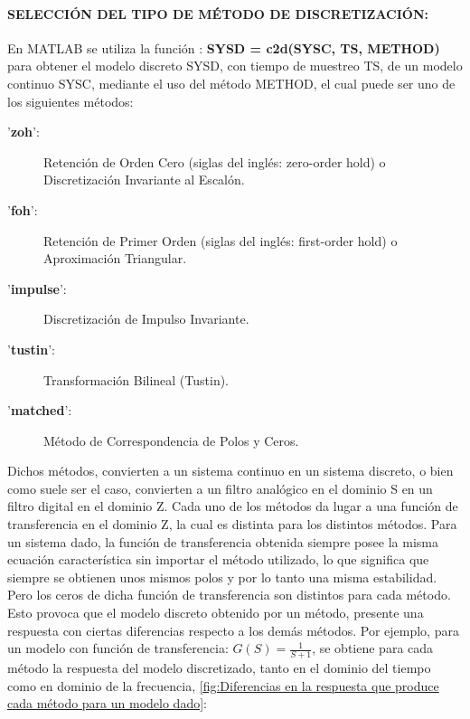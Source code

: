 \documentclass{article}
\begin{document}
\begin{sloppypar}
\paragraph{SELECCIÓN DEL TIPO DE MÉTODO DE DISCRETIZACIÓN:}
\label{sec:SELECCIÓN DEL TIPO DE MÉTODO DE DISCRETIZACIÓN:}
\hfill

\hfill

En MATLAB se utiliza la función \cite{c2d}: \textbf{SYSD = c2d(SYSC, TS, METHOD)} para obtener el modelo discreto SYSD, con tiempo de muestreo TS, de un modelo continuo SYSC, mediante el uso del método METHOD, el cual puede ser uno de los siguientes métodos:
\begin{description}
    \item ['\textbf{zoh}':] Retención de Orden Cero (siglas del inglés: zero-order hold) o Discretización Invariante al Escalón.
    \item ['\textbf{foh}':] Retención de Primer Orden (siglas del inglés: first-order hold) o Aproximación Triangular.
    \item ['\textbf{impulse}':] Discretización de Impulso Invariante.
    \item ['\textbf{tustin}':] Transformación Bilineal (Tustin).
    \item ['\textbf{matched}':] Método de Correspondencia de Polos y Ceros.
\end{description}

Dichos métodos, convierten a un sistema continuo en un sistema discreto, o bien como suele ser el caso, convierten a un filtro analógico en el dominio S en un filtro digital en el dominio Z.
Cada uno de los métodos da lugar a una función de transferencia en el dominio Z, la cual es distinta para los distintos métodos. Para un sistema dado, la función de transferencia obtenida siempre posee la misma ecuación característica sin importar el método utilizado, lo que significa que siempre se obtienen unos mismos polos y por lo tanto una misma estabilidad. Pero los ceros de dicha función de transferencia son distintos para cada método. Esto provoca que el modelo discreto obtenido por un método, presente una respuesta con ciertas diferencias respecto a los demás métodos. Por ejemplo, para un modelo con función de transferencia: $G(S)=\frac{1}{S+1}$, se obtiene para cada método la respuesta del modelo discretizado, tanto en el dominio del tiempo como en dominio de la frecuencia, \ref{fig:Diferencias en la respuesta que produce cada método para un modelo dado}:


\end{sloppypar}
\end{document}
